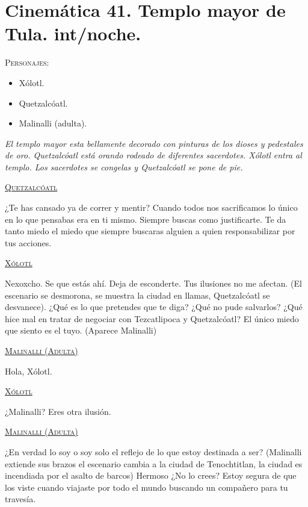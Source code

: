 \section{Cinemática 41. Templo mayor de Tula. int/noche.}
\label{Cin:Cinematica41}
 \textsc{Personajes}:
 \begin{itemize}
 \item Xólotl.
 \item Quetzalcóatl.
 \item Malinalli (adulta).
 \end{itemize}
\textit{El templo mayor esta bellamente decorado con pinturas de los dioses y pedestales de oro. Quetzalcóatl está orando rodeado de diferentes sacerdotes. Xólotl entra al templo. Los sacerdotes se congelas y Quetzalcóatl se pone de pie.}
\begin{center}
\textsc{\underline{Quetzalcóatl}}
\\
\par
¿Te has cansado ya de correr y mentir? Cuando todos nos sacrificamos lo único en lo que pensabas era en ti mismo. Siempre buscas como justificarte. Te da tanto miedo el miedo que siempre buscaras alguien a quien responsabilizar por tus acciones.
\\
\par
\textsc{\underline{Xólotl}}
\\
\par
Nexoxcho. Se que estás ahí. Deja de esconderte. Tus ilusiones no me afectan.
(El escenario se desmorona, se muestra la ciudad en llamas, Quetzalcóatl se desvanece).
¿Qué es lo que pretendes que te diga? ¿Qué no pude salvarlos? ¿Qué hice mal en tratar de negociar con Tezcatlipoca y Quetzalcóatl? El único miedo que siento es el tuyo.
(Aparece Malinalli)
\\
\par
\textsc{\underline{Malinalli (Adulta)}}
\\
\par
Hola, Xólotl.
\\
\par
\textsc{\underline{Xólotl}}
\\
\par
¿Malinalli? Eres otra ilusión.
\\
\par
\textsc{\underline{Malinalli (Adulta)}}
\\
\par
¿En verdad lo soy o soy solo el reflejo de lo que estoy destinada a ser? (Malinalli extiende sus brazos el escenario cambia a la ciudad de Tenochtitlan, la ciudad es incendiada por el asalto de barcos) Hermoso ¿No lo crees? Estoy segura de que los viste cuando viajaste por todo el mundo buscando un compañero para tu travesía.

\end{center}
